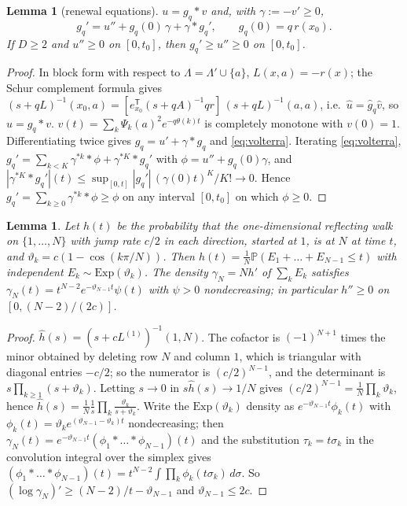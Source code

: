 \documentclass[11pt,a4paper]{article}
\newtheorem{lemma}[theorem]{Lemma}
\theoremstyle{definition}
\newcommand{\Prob}{\mathbb P}
\newcommand{\T}{^{\mathsf T}}
\begin{document}
\begin{lemma}[renewal equations]\label{lem:renewal}
$u=g_q*v$ and, with $\gamma:=-v'\ge0$,
\begin{equation}\label{eq:volterra}
g_q'=u''+g_q(0)\,\gamma+\gamma*g_q' ,\qquad g_q(0)=q\,r(x_0).
\end{equation}
If $D\ge2$ and $u''\ge0$ on $[0,t_0]$, then $g_q'\ge u''\ge0$ on $[0,t_0]$.
\end{lemma}
\begin{proof}
In block form with respect to $\Lambda=\Lambda'\cup\{a\}$, $L(x,a)=-r(x)$; the Schur complement formula gives $(s+qL)^{-1}(x_0,a)=[e_{x_0}\T(s+qA)^{-1}qr]\,(s+qL)^{-1}(a,a)$, i.e.\ $\hat u=\hat g_q\hat v$, so $u=g_q*v$. $v(t)=\sum_k\Psi_k(a)^2e^{-q\theta(k)t}$ is completely monotone with $v(0)=1$. Differentiating twice gives $g_q=u'+\gamma*g_q$ and \eqref{eq:volterra}. Iterating \eqref{eq:volterra}, $g_q'=\sum_{k<K}\gamma^{*k}*\phi+\gamma^{*K}*g_q'$ with $\phi=u''+g_q(0)\gamma$, and $|\gamma^{*K}*g_q'|(t)\le\sup_{[0,t]}|g_q'|\,(\gamma(0)t)^K/K!\to0$. Hence $g_q'=\sum_{k\ge0}\gamma^{*k}*\phi\ge\phi$ on any interval $[0,t_0]$ on which $\phi\ge0$.
\end{proof}

\begin{lemma}\label{lem:hypo}
Let $h(t)$ be the probability that the one-dimensional reflecting walk on $\{1,\dots,N\}$ with jump rate $c/2$ in each direction, started at $1$, is at $N$ at time $t$, and $\vartheta_k=c(1-\cos(k\pi/N))$. Then $h(t)=\frac1N\Prob(E_1+\dots+E_{N-1}\le t)$ with independent $E_k\sim\mathrm{Exp}(\vartheta_k)$. The density $\gamma_N=Nh'$ of $\sum_kE_k$ satisfies $\gamma_N(t)=t^{N-2}e^{-\vartheta_{N-1}t}\psi(t)$ with $\psi>0$ nondecreasing; in particular $h''\ge0$ on $[0,(N-2)/(2c)]$.
\end{lemma}
\begin{proof}
$\hat h(s)=(s+cL^{(1)})^{-1}(1,N)$. The cofactor is $(-1)^{N+1}$ times the minor obtained by deleting row $N$ and column $1$, which is triangular with diagonal entries $-c/2$; so the numerator is $(c/2)^{N-1}$, and the determinant is $s\prod_{k\ge1}(s+\vartheta_k)$. Letting $s\to0$ in $s\hat h(s)\to1/N$ gives $(c/2)^{N-1}=\frac1N\prod_k\vartheta_k$, hence $\hat h(s)=\frac1N\frac1s\prod_k\frac{\vartheta_k}{s+\vartheta_k}$. Write the $\mathrm{Exp}(\vartheta_k)$ density as $e^{-\vartheta_{N-1}t}\phi_k(t)$ with $\phi_k(t)=\vartheta_ke^{(\vartheta_{N-1}-\vartheta_k)t}$ nondecreasing; then $\gamma_N(t)=e^{-\vartheta_{N-1}t}(\phi_1*\dots*\phi_{N-1})(t)$ and the substitution $\tau_k=t\sigma_k$ in the convolution integral over the simplex gives $(\phi_1*\dots*\phi_{N-1})(t)=t^{N-2}\int\prod_k\phi_k(t\sigma_k)\,d\sigma$. So $(\log\gamma_N)'\ge(N-2)/t-\vartheta_{N-1}$ and $\vartheta_{N-1}\le2c$.
\end{proof}
\end{document}
